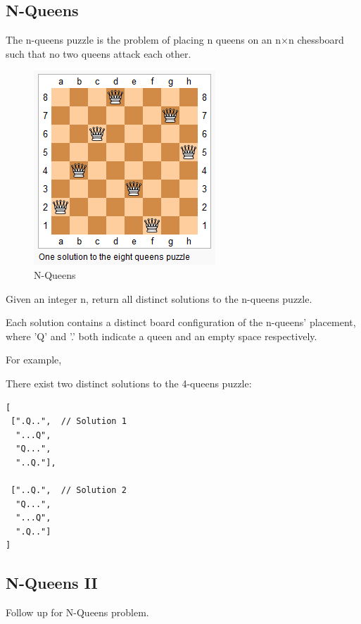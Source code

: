 \documentclass[12pt]{book}
\begin{document}
\subsection{N-Queens}
\label{sec-11-2-1}
The n-queens puzzle is the problem of placing n queens on an n×n chessboard such that no two queens attack each other.
\begin{figure}[htb]
\centering
\includegraphics[width=.9\linewidth]{./pic/8-queens.png}
\caption{N-Queens}
\end{figure}

Given an integer n, return all distinct solutions to the n-queens puzzle.

Each solution contains a distinct board configuration of the n-queens' placement, where 'Q' and '.' both indicate a queen and an empty space respectively.

For example,

There exist two distinct solutions to the 4-queens puzzle:
\lstset{language=java,label= ,caption= ,numbers=none}
\begin{lstlisting}
[
 [".Q..",  // Solution 1
  "...Q",
  "Q...",
  "..Q."],

 ["..Q.",  // Solution 2
  "Q...",
  "...Q",
  ".Q.."]
]
\end{lstlisting}
\subsection{N-Queens II}
\label{sec-11-2-2}
Follow up for N-Queens problem.
\end{document}
